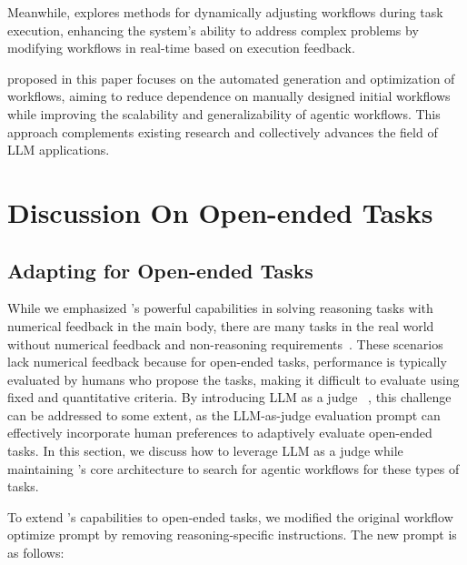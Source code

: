 Meanwhile, \cite{niu2025flow} explores methods for dynamically adjusting workflows during task execution, enhancing the system's ability to address complex problems by modifying workflows in real-time based on execution feedback.

\model proposed in this paper focuses on the automated generation and optimization of workflows, aiming to reduce dependence on manually designed initial workflows while improving the scalability and generalizability of agentic workflows. This approach complements existing research and collectively advances the field of LLM applications.


\section{Discussion On Open-ended Tasks}
\label{appendix:discussion}
\subsection{Adapting \model for Open-ended Tasks}

While we emphasized \model's powerful capabilities in solving reasoning tasks with numerical feedback in the main body, there are many tasks in the real world without numerical feedback and non-reasoning requirements~\citep{dai2024mmrole}. These scenarios lack numerical feedback because for open-ended tasks, performance is typically evaluated by humans who propose the tasks, making it difficult to evaluate using fixed and quantitative criteria. By introducing LLM as a judge ~\citep{zheng2023judging}, this challenge can be addressed to some extent, as the LLM-as-judge evaluation prompt can effectively incorporate human preferences to adaptively evaluate open-ended tasks. In this section, we discuss how to leverage LLM as a judge while maintaining \model's core architecture to search for agentic workflows for these types of tasks.

To extend \model's capabilities to open-ended tasks, we modified the original workflow optimize prompt by removing reasoning-specific instructions. The new prompt is as follows: 

\label{appendix:modified prompt}

